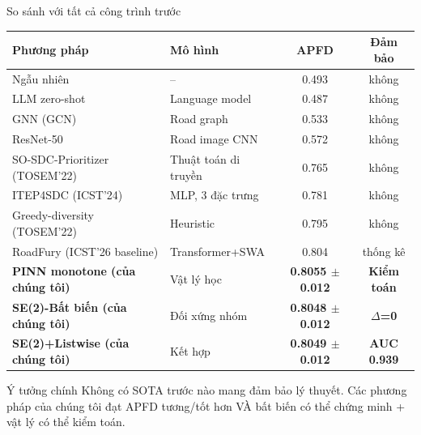 \documentclass[aspectratio=169,10pt]{beamer}
\begin{document}
\begin{frame}{So sánh với tất cả công trình trước}
\scriptsize
\begin{center}
\begin{tabular}{l l c c}
\toprule
\textbf{Phương pháp} & \textbf{Mô hình} & \textbf{APFD} & \textbf{Đảm bảo} \\
\midrule
Ngẫu nhiên & -- & 0.493 & không \\
LLM zero-shot & Language model & 0.487 & không \\
GNN (GCN) & Road graph & 0.533 & không \\
ResNet-50 & Road image CNN & 0.572 & không \\
SO-SDC-Prioritizer (TOSEM'22) & Thuật toán di truyền & 0.765 & không \\
ITEP4SDC (ICST'24) & MLP, 3 đặc trưng & 0.781 & không \\
Greedy-diversity (TOSEM'22) & Heuristic & 0.795 & không \\
RoadFury (ICST'26 baseline) & Transformer+SWA & 0.804 & thống kê \\
\midrule
\rowcolor{success!15}
\textbf{PINN monotone (của chúng tôi)} & Vật lý học & \textbf{0.8055 $\pm$ 0.012} & \cellcolor{success!25}\textbf{Kiểm toán} \\
\rowcolor{success!15}
\textbf{SE(2)-Bất biến (của chúng tôi)} & Đối xứng nhóm & \textbf{0.8048 $\pm$ 0.012} & \cellcolor{success!25}\textbf{$\Delta$=0} \\
\rowcolor{accent!15}
\textbf{SE(2)+Listwise (của chúng tôi)} & Kết hợp & \textbf{0.8049 $\pm$ 0.012} & \cellcolor{accent!25}\textbf{AUC 0.939} \\
\bottomrule
\end{tabular}
\end{center}

\begin{block}{Ý tưởng chính}
\scriptsize
\alert{Không có SOTA trước nào mang đảm bảo lý thuyết.} Các phương pháp của chúng tôi đạt APFD tương/tốt hơn \alert{VÀ} bất biến có thể chứng minh + vật lý có thể kiểm toán.
\end{block}
\end{frame}
\end{document}
